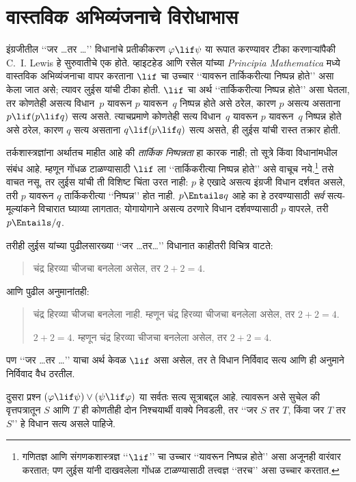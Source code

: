 \section{वास्तविक अभिव्यंजनाचे विरोधाभास}\label{cnt:int:par:sec}

इंग्रजीतील ‘‘जर \dots तर \dots’’
विधानांचे प्रतीकीकरण $\varphi \lif \psi$
या रूपात करण्यावर टीका करणाऱ्यांपैकी
C.~I. Lewis हे सुरुवातीचे एक होते.
व्हाइटहेड आणि रसेल यांच्या
\emph{Principia Mathematica} मध्ये
वास्तविक अभिव्यंजनाचा वापर करताना
$\lif$ चा उच्चार ‘‘यावरून
तार्किकरीत्या निष्पन्न होते’’ असा
केला जात असे; त्यावर लुईस यांची
टीका होती. $\lif$ चा अर्थ
‘‘तार्किकरीत्या निष्पन्न होते’’
असा घेतला, तर कोणतेही असत्य
विधान~$p$ यावरून $p$ यावरून~$q$
निष्पन्न होते असे ठरेल, कारण
$p$ असत्य असताना
$p \lif (p \lif q)$ सत्य असते.
त्याचप्रमाणे कोणतेही सत्य
विधान~$q$ यावरून $p$ यावरून~$q$
निष्पन्न होते असे ठरेल, कारण
$q$ सत्य असताना
$q \lif (p \lif q)$ सत्य असते,
ही लुईस यांची रास्त तक्रार होती.

तर्कशास्त्रज्ञांना अर्थातच माहीत
आहे की \emph{तार्किक निष्पन्नता}
हा कारक नाही; तो सूत्रे
किंवा विधानांमधील संबंध आहे.
म्हणून गोंधळ टाळण्यासाठी
$\lif$ ला ‘‘तार्किकरीत्या निष्पन्न
होते’’ असे वाचूच नये.\footnote{
  गणितज्ञ आणि संगणकशास्त्रज्ञ
  ‘‘$\lif$’’ चा उच्चार ‘‘यावरून
  निष्पन्न होते’’ असा अजूनही
  वारंवार करतात; पण लुईस यांनी
  दाखवलेला गोंधळ टाळण्यासाठी
  तत्त्वज्ञ ‘‘तरच’’ असा
  उच्चार करतात.} तसे
वाचत नसू, तर लुईस यांची
ती विशिष्ट चिंता उरत नाही:
$p$ हे एखादे असत्य इंग्रजी
विधान दर्शवत असले, तरी
$p$ यावरून $q$ तार्किकरीत्या
‘‘निष्पन्न’’ होत नाही.
$p \Entails q$ आहे का हे
ठरवण्यासाठी \emph{सर्व}
सत्य-मूल्यांकने विचारात घ्याव्या
लागतात; योगायोगाने असत्य
ठरणारे विधान दर्शवण्यासाठी
$p$ वापरले, तरी
$p \Entails/ q$.

तरीही लुईस यांच्या पुढीलसारख्या
‘‘जर \dots तर\dots’’ विधानात
काहीतरी विचित्र वाटते:
\begin{quote}
चंद्र हिरव्या चीजचा बनलेला असेल,
तर $2+2=4$.
\end{quote}
आणि पुढील अनुमानांतही:
\begin{quote}
  चंद्र हिरव्या चीजचा बनलेला नाही.
  म्हणून चंद्र हिरव्या चीजचा
  बनलेला असेल, तर $2+2=4$.

  $2+2 = 4$. म्हणून चंद्र
  हिरव्या चीजचा बनलेला
  असेल, तर $2+2=4$.
\end{quote}
पण ‘‘जर \dots तर \dots’’
याचा अर्थ केवळ $\lif$
असा असेल, तर ते विधान
निर्विवाद सत्य आणि ही
अनुमाने निर्विवाद वैध ठरतील.

दुसरा प्रश्न $(\varphi \lif \psi) \lor (\psi \lif
\varphi)$ या सर्वतः सत्य सूत्राबद्दल
आहे. त्यावरून असे सुचेल की
वृत्तपत्रातून $S$ आणि $T$
ही कोणतीही दोन निश्चयार्थी
वाक्ये निवडली, तर ‘‘जर
$S$ तर $T$, किंवा जर
$T$ तर~$S$’’ हे विधान
सत्य असले पाहिजे.













